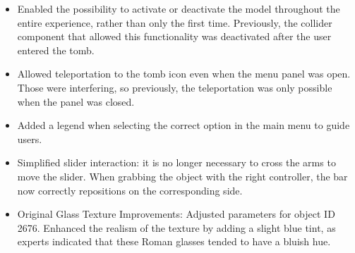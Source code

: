\begin{itemize}
 \item Enabled the possibility to activate or deactivate the model throughout the entire experience, rather than only the first time. Previously, the collider component that allowed this functionality was deactivated after the user entered the tomb.
 \item Allowed teleportation to the tomb icon even when the menu panel was open. Those were interfering, so previously, the teleportation was only possible when the panel was closed.
 \item Added a legend when selecting the correct option in the main menu to guide users.
 \item Simplified slider interaction: it is no longer necessary to cross the arms to move the slider. When grabbing the object with the right controller, the bar now correctly repositions on the corresponding side.
 \item Original Glass Texture Improvements: Adjusted parameters for object ID 2676. Enhanced the realism of the texture by adding a slight blue tint, as experts indicated that these Roman glasses tended to have a bluish hue.
\end{itemize}

